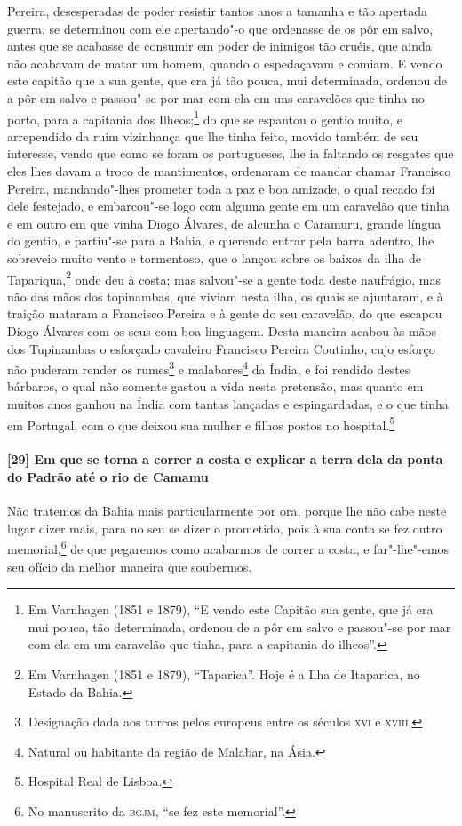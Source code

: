 \begin{linenumbers}
Pereira, desesperadas de poder resistir tantos anos a tamanha e tão apertada guerra, se
determinou com ele apertando"-o que ordenasse de os pôr em salvo, antes que se acabasse de
consumir em poder de inimigos tão cruéis, que ainda não acabavam de matar um homem, quando
o espedaçavam e comiam. E vendo este capitão que a sua gente, que era já tão pouca, mui
determinada, ordenou de a pôr em salvo e passou"-se por mar com ela em uns caravelões que
tinha no porto, para a capitania dos Ilheos;\footnote{ Em Varnhagen (1851 e 1879), ``E
vendo este Capitão sua gente, que já era mui pouca, tão determinada, ordenou de a pôr em
salvo e passou"-se por mar com ela em um caravelão que tinha, para a capitania do
ilheos''.} do que se espantou o gentio muito, e arrependido da ruim vizinhança que lhe
tinha feito, movido também de seu interesse, vendo que como se foram os portugueses, lhe
ia faltando os resgates que eles lhes davam a troco de mantimentos, ordenaram de mandar
chamar Francisco Pereira, mandando"-lhes prometer toda a paz e boa amizade, o qual recado
foi dele festejado, e embarcou"-se logo com alguma gente em um caravelão que tinha e em
outro em que vinha Diogo Álvares, de alcunha o Caramuru, grande língua do gentio, e
partiu"-se para a Bahia, e querendo entrar pela barra adentro, lhe sobreveio muito vento e
tormentoso, que o lançou sobre os baixos da ilha de Tapariqua,\footnote{ Em Varnhagen (1851
e 1879), ``Taparica''. Hoje é a Ilha de Itaparica, no Estado da Bahia.} onde deu à costa;
mas salvou"-se a gente toda deste naufrágio, mas não das mãos dos topinambas, que viviam
nesta ilha, os quais se ajuntaram, e à traição mataram a Francisco Pereira e à gente do
seu caravelão, do que escapou Diogo Álvares com os seus com boa linguagem. Desta maneira
acabou às mãos dos Tupinambas o esforçado cavaleiro Francisco Pereira Coutinho, cujo
esforço não puderam render os rumes\footnote{ Designação dada aos turcos pelos europeus
entre os séculos \textsc{xvi} e \textsc{xviii}.} e malabares\footnote{ Natural ou
habitante da região de Malabar, na Ásia.} da Índia, e foi rendido destes bárbaros, o qual
não somente gastou a vida nesta pretensão, mas quanto em muitos anos ganhou na Índia com
tantas lançadas e espingardadas, e o que tinha em Portugal, com o que deixou sua mulher e
filhos postos no hospital.\footnote{ Hospital Real de Lisboa.}

\paragraph{[29] Em que se torna a correr a costa e explicar a terra dela da ponta do Padrão
até o rio de Camamu} \quad
Não tratemos da Bahia mais particularmente por ora, porque lhe não cabe neste lugar dizer
mais, para no seu se dizer o prometido, pois à sua conta se fez outro memorial,\footnote{
No manuscrito da \textsc{bgjm}, ``se fez este memorial''.} de que pegaremos como acabarmos
de correr a costa, e far"-lhe"-emos seu ofício da melhor maneira que soubermos.


\end{linenumbers}
